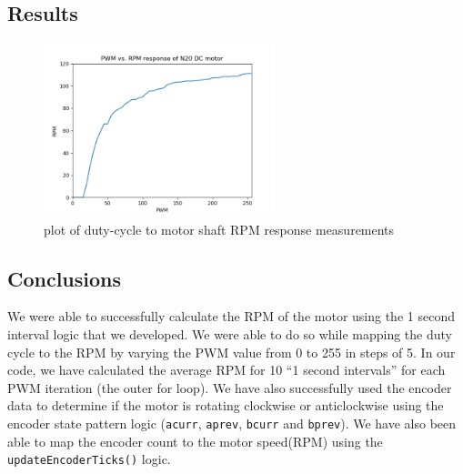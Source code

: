 \documentclass[12pt]{article}
\begin{document}
\pagebreak
\subsection{Results}

\begin{figure}[ht!]
    \centering
    \includegraphics[width=0.6\textwidth]{images/n20.png}
    \caption{plot of duty-cycle to motor shaft RPM response measurements}
\end{figure}

\subsection{Conclusions}

We were able to successfully calculate the RPM of the motor using the 1 second interval logic that we developed. We were able to do so while mapping the duty cycle to the RPM by varying the PWM value from 0 to 255 in steps of 5. In our code, we have calculated the average RPM for 10 “1 second intervals” for each PWM iteration (the outer for loop). We have also successfully used the encoder data to determine if the motor is rotating clockwise or anticlockwise using the encoder state pattern logic (\texttt{acurr}, \texttt{aprev}, \texttt{bcurr} and \texttt{bprev}). We have also been able to map the encoder count to the motor speed(RPM) using the \texttt{updateEncoderTicks()} logic.
\end{document}
